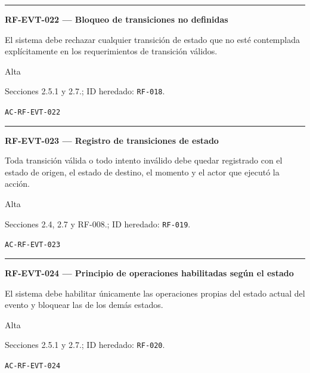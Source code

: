 \documentclass[10pt,letterpaper]{article}
\begin{document}
\vspace{0.25em}\hrule\vspace{0.65em}
\noindent\textbf{RF-EVT-022 --- Bloqueo de transiciones no definidas}\par
\begin{description}[style=nextline,leftmargin=3.15cm,labelwidth=2.8cm,font=\normalfont\bfseries]
\item[Obligación] El sistema debe rechazar cualquier transición de estado que no esté contemplada explícitamente en los requerimientos de transición válidos.
\item[Prioridad] Alta
\item[Procedencia] Secciones 2.5.1 y 2.7.; ID heredado: \texttt{RF-018}.
\item[Verificación] \texttt{AC-RF-EVT-022}
\end{description}
\vspace{0.25em}\hrule\vspace{0.65em}
\noindent\textbf{RF-EVT-023 --- Registro de transiciones de estado}\par
\begin{description}[style=nextline,leftmargin=3.15cm,labelwidth=2.8cm,font=\normalfont\bfseries]
\item[Obligación] Toda transición válida o todo intento inválido debe quedar registrado con el estado de origen, el estado de destino, el momento y el actor que ejecutó la acción.
\item[Prioridad] Alta
\item[Procedencia] Secciones 2.4, 2.7 y RF-008.; ID heredado: \texttt{RF-019}.
\item[Verificación] \texttt{AC-RF-EVT-023}
\end{description}
\vspace{0.25em}\hrule\vspace{0.65em}
\noindent\textbf{RF-EVT-024 --- Principio de operaciones habilitadas según el estado}\par
\begin{description}[style=nextline,leftmargin=3.15cm,labelwidth=2.8cm,font=\normalfont\bfseries]
\item[Obligación] El sistema debe habilitar únicamente las operaciones propias del estado actual del evento y bloquear las de los demás estados.
\item[Prioridad] Alta
\item[Procedencia] Secciones 2.5.1 y 2.7.; ID heredado: \texttt{RF-020}.
\item[Verificación] \texttt{AC-RF-EVT-024}
\end{description}
\end{document}
